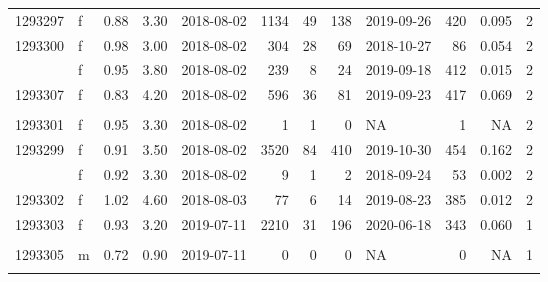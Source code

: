 \documentclass[
  authoryear,
  review,
  3p]{elsarticle}
\begin{document}
\begin{table}[H]
\begin{tabular}{llrrlrrrlrrr}
1293297 & f & 0.88 & 3.30 & 2018-08-02 & 1134 & 49 & 138 & 2019-09-26 & 420 & 0.095 & 2\\
1293300 & f & 0.98 & 3.00 & 2018-08-02 & 304 & 28 & 69 & 2018-10-27 & 86 & 0.054 & 2\\
\addlinespace
1293298 & f & 0.95 & 3.80 & 2018-08-02 & 239 & 8 & 24 & 2019-09-18 & 412 & 0.015 & 2\\
1293307 & f & 0.83 & 4.20 & 2018-08-02 & 596 & 36 & 81 & 2019-09-23 & 417 & 0.069 & 2\\
\cellcolor[HTML]{E2E2E2}{\textcolor{black}{1293308}} & \cellcolor[HTML]{E2E2E2}{\textcolor{black}{f}} & \cellcolor[HTML]{E2E2E2}{\textcolor{black}{0.99}} & \cellcolor[HTML]{E2E2E2}{\textcolor{black}{3.70}} & \cellcolor[HTML]{E2E2E2}{\textcolor{black}{2018-08-02}} & \cellcolor[HTML]{E2E2E2}{\textcolor{black}{2067}} & \cellcolor[HTML]{E2E2E2}{\textcolor{black}{55}} & \cellcolor[HTML]{E2E2E2}{\textcolor{black}{257}} & \cellcolor[HTML]{E2E2E2}{\textcolor{black}{2019-10-05}} & \cellcolor[HTML]{E2E2E2}{\textcolor{black}{429}} & \cellcolor[HTML]{E2E2E2}{\textcolor{black}{0.106}} & \cellcolor[HTML]{E2E2E2}{\textcolor{black}{2}}\\
1293301 & f & 0.95 & 3.30 & 2018-08-02 & 1 & 1 & 0 & NA & 1 & NA & 2\\
1293299 & f & 0.91 & 3.50 & 2018-08-02 & 3520 & 84 & 410 & 2019-10-30 & 454 & 0.162 & 2\\
\addlinespace
1293309 & f & 0.92 & 3.30 & 2018-08-02 & 9 & 1 & 2 & 2018-09-24 & 53 & 0.002 & 2\\
1293302 & f & 1.02 & 4.60 & 2018-08-03 & 77 & 6 & 14 & 2019-08-23 & 385 & 0.012 & 2\\
1293303 & f & 0.93 & 3.20 & 2019-07-11 & 2210 & 31 & 196 & 2020-06-18 & 343 & 0.060 & 1\\
\cellcolor[HTML]{E2E2E2}{\textcolor{black}{1293304}} & \cellcolor[HTML]{E2E2E2}{\textcolor{black}{f}} & \cellcolor[HTML]{E2E2E2}{\textcolor{black}{0.72}} & \cellcolor[HTML]{E2E2E2}{\textcolor{black}{1.35}} & \cellcolor[HTML]{E2E2E2}{\textcolor{black}{2019-07-11}} & \cellcolor[HTML]{E2E2E2}{\textcolor{black}{0}} & \cellcolor[HTML]{E2E2E2}{\textcolor{black}{0}} & \cellcolor[HTML]{E2E2E2}{\textcolor{black}{0}} & \cellcolor[HTML]{E2E2E2}{\textcolor{black}{NA}} & \cellcolor[HTML]{E2E2E2}{\textcolor{black}{9}} & \cellcolor[HTML]{E2E2E2}{\textcolor{black}{NA}} & \cellcolor[HTML]{E2E2E2}{\textcolor{black}{1}}\\
1293305 & m & 0.72 & 0.90 & 2019-07-11 & 0 & 0 & 0 & NA & 0 & NA & 1\\
\addlinespace

\end{tabular}
\end{table}
\end{document}
